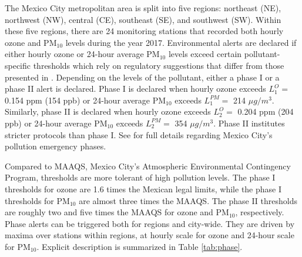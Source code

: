 \documentclass[alpha-refs]{wiley-article}
\begin{document}
The Mexico City metropolitan area is split into five regions: northeast (NE), northwest (NW), central (CE), southeast (SE), and southwest (SW). Within these five regions, there are 24 monitoring stations that recorded both hourly ozone and $\text{PM}_{10}$ levels during the year 2017. Environmental alerts are declared if either hourly ozone or 24-hour average $\text{PM}_{10}$ levels exceed certain pollutant-specific thresholds which rely on regulatory suggestions that differ from those presented in \citet{nom14a,nom14b}.
Depending on the levels of the pollutant, either a phase I or a phase II alert is declared. Phase I is declared when hourly ozone exceeds $L_{1}^{O}=$ 0.154 ppm (154 ppb) or 24-hour average $\text{PM}_{10}$ exceeds $L_{1}^{PM}=$ 214 $\mu g/m^{3}$.
Similarly, phase II is declared when hourly ozone exceeds $L_{2}^{O}=$ 0.204 ppm (204 ppb) or 24-hour average $\text{PM}_{10}$ exceeds $L_{2}^{PM}=$ 354 $\mu g/m^{3}$. Phase II institutes stricter protocols than phase I.
See \citet{mc2016} for full details regarding Mexico City's pollution emergency phases.

Compared to MAAQS, Mexico City's Atmospheric Environmental Contingency Program, thresholds are more tolerant of high pollution levels. The phase I thresholds for ozone are 1.6 times the Mexican legal limits, while the phase I thresholds for $\text{PM}_{10}$ are almost three times the MAAQS. The phase II thresholds are roughly two and five times the MAAQS for ozone and $\text{PM}_{10}$, respectively. Phase alerts can be triggered both for regions and city-wide.  They are driven by maxima over stations within regions, at hourly scale for ozone and 24-hour scale for $\text{PM}_{10}$.  Explicit description is summarized in Table \ref{tab:phase}.
\end{document}
